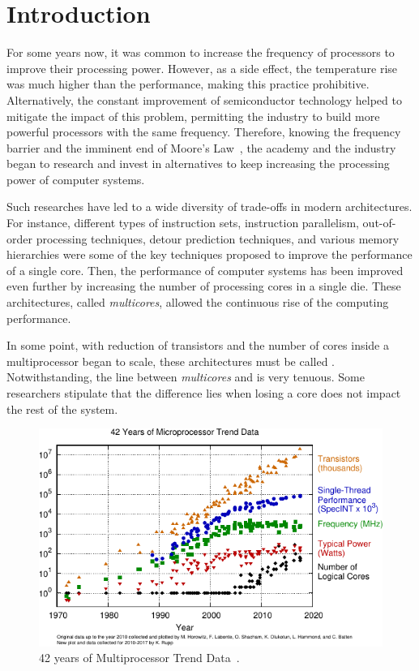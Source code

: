 \chapter{Introduction}
\label{ch.intro}

	For some years now, it was common to increase the frequency of processors
	to improve their processing power.
	However, as a side effect, the temperature rise was much higher than the
	performance, making this practice prohibitive.
	Alternatively, the constant improvement of semiconductor technology helped
	to mitigate the impact of this problem, permitting the industry to build
	more powerful processors with the same frequency.
	Therefore, knowing the frequency barrier and the imminent end of Moore's Law~\cite{moore:1965},
	the academy and the industry began to research and invest in alternatives
	to keep increasing the processing power of computer systems.

	Such researches have led to a wide diversity of trade-offs in modern architectures.
	For instance, different types of instruction sets, instruction parallelism,
	out-of-order processing techniques, detour prediction techniques, and various
	memory hierarchies were some of the key techniques proposed to improve the
	performance of a single core.
	Then, the performance of computer systems has been improved even further by
	increasing the number of processing cores in a single die.
	These architectures, called \textit{multicores}, allowed the continuous
	rise of the computing performance.

	In some point, with reduction of transistors and the number of cores inside
	a multiprocessor began to scale, these architectures must be called \manycores.
	Notwithstanding, the line between \textit{multicores} and \manycores is very tenuous.
	Some researchers stipulate that the difference lies when losing a core
	does not impact the rest of the system.

	\begin{figure}[h]
		\centering
		\includegraphics[width=.85\textwidth]{images/42-years-processor-trend.pdf}

		\caption{
			42 years of Multiprocessor Trend Data~\cite{url:microprocessor-trend-data}.
		}\par
		\label{fig.microprocessor-data}
	\end{figure}

